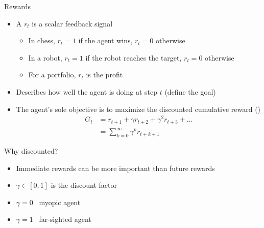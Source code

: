 \documentclass[presentation, 9pt]{beamer}\mode<presentation>{\usetheme{AMSBolognaFC}}
\begin{document}
\begin{frame}{Rewards}
\begin{itemize}
	\item A  $r_t$ is a scalar feedback signal
	\begin{itemize}
		\item In chess, $r_t = 1$ if the agent wins, $r_t = 0$ otherwise
		\item In a robot, $r_t = 1$ if the robot reaches the target, $r_t = 0$ otherwise
		\item For a portfolio, $r_t$ is the profit
	\end{itemize}
	\item Describes how well the agent is doing at step $t$ (define the goal)
	\item The agent's sole objective is to maximize the discounted cumulative reward ()
	\begin{equation*}
	\begin{split}
		G_t & = r_{t+1} + \gamma r_{t+2} + \gamma^2 r_{t+3} + \dots \\
		 & = \sum_{k=0}^{\infty} \gamma^k r_{t+k+1}
		\end{split}
	\end{equation*}
\end{itemize}
\begin{alertblock}{Why discounted?}
\begin{itemize}
	\item Immediate rewards can be more important than future rewards
	\item $\gamma \in [0,1]$ is the discount factor
	\item $\gamma = 0$ \faArrowRight \, myopic agent
	\item $\gamma = 1$ \faArrowRight \, far-sighted agent
\end{itemize}
\end{alertblock}
\end{frame}
\end{document}
